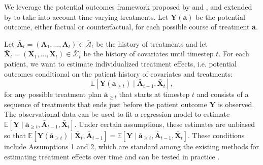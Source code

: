 \documentclass{article}
\newcommand{\vc}[1]{\mathbf{#1}}
\newcommand{\cl}[1]{\mathcal{#1}}
\newcommand{\hist}[1]{\bar{\vc{#1}}}
\newcommand{\histcl}[1]{\bar{\cl{#1}}}
\begin{document}
	We leverage the potential outcomes framework proposed by \citet{rubin1978bayesian} and \citet{neyman1923applications}, and extended by \citet{robins2008estimation} to take into account time-varying treatments. Let $\vc{Y}(\bar{\vc{a}})$ be the potential outcome, either factual or counterfactual, for each possible course of treatment $\bar{\vc{a}}$. 
	
	Let $\bar{\vc{A}}_{t} = (\vc{A}_1, \dots, \vc{A}_t)\in\histcl{A}_{t}$ be the history of treatments and let $\bar{\vc{X}}_{t} = (\vc{X}_1, \dots, \vc{X}_t)  \in \bar{\cl{X}}_t$ be the history of covariates until timestep $t$. For each patient, we want to estimate individualized treatment effects, i.e. potential outcomes conditional on the patient history of covariates and treatments:
	\begin{equation}
	    \mathbb{E}[\vc{Y}(\hist{a}_{\geq t}) \mid \hist{A}_{t-1}, \hist{X}_t],
	\end{equation}
	for any possible treatment plan $\hist{a}_{\geq t}$ that starts at timestep $t$ and consists of a sequence of treatments that ends just before the patient outcome $\vc{Y}$ is observed. The observational data can be used to fit a regression model to estimate $\mathbb{E} [\vc{Y} \mid \hist{a}_{\geq t}, \hist{A}_{t-1}, \hist{X}_t]$. Under certain assumptions, these estimates are unbiased so that $\mathbb{E} [\vc{Y}(\hist{a}_{\geq t}) \mid  \hist{X}_t, \hist{A}_{t-1} ] = \mathbb{E} [\vc{Y} \mid \hist{a}_{\geq t}, \hist{A}_{t-1}, \hist{X}_t]$. These conditions include Assumptions 1 and 2, which are standard among the existing methods for estimating treatment effects over time and can be tested in practice \citep{robins2008estimation}. 
	
	
	
\end{document}
